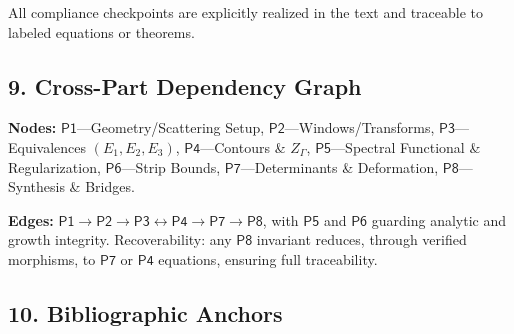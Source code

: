 All compliance checkpoints are explicitly realized in the text and traceable to labeled equations or theorems.\relax\hspace{0pt}

\subsection*{9. Cross-Part Dependency Graph}\relax\hspace{0pt}
\label{subsec:tfc8-dep}\relax\hspace{0pt}

\noindent
\textbf{Nodes:}  
$\mathsf{P1}$—Geometry/Scattering Setup,  
$\mathsf{P2}$—Windows/Transforms,  
$\mathsf{P3}$—Equivalences $(E_1,E_2,E_3)$,  
$\mathsf{P4}$—Contours \& $Z_\Gamma$,  
$\mathsf{P5}$—Spectral Functional \& Regularization,  
$\mathsf{P6}$—Strip Bounds,  
$\mathsf{P7}$—Determinants \& Deformation,  
$\mathsf{P8}$—Synthesis \& Bridges.

\noindent
\textbf{Edges:}  
$\mathsf{P1}\!\rightarrow\!\mathsf{P2}\!\rightarrow\!\mathsf{P3}\!\leftrightarrow\!\mathsf{P4}\!\rightarrow\!\mathsf{P7}\!\rightarrow\!\mathsf{P8}$,  
with $\mathsf{P5}$ and $\mathsf{P6}$ guarding analytic and growth integrity.  
Recoverability: any $\mathsf{P8}$ invariant reduces, through verified morphisms, to $\mathsf{P7}$ or $\mathsf{P4}$ equations, ensuring full traceability.\relax\hspace{0pt}

\subsection*{10. Bibliographic Anchors}\relax\hspace{0pt}
\label{subsec:tfc8-refs}\relax\hspace{0pt}

